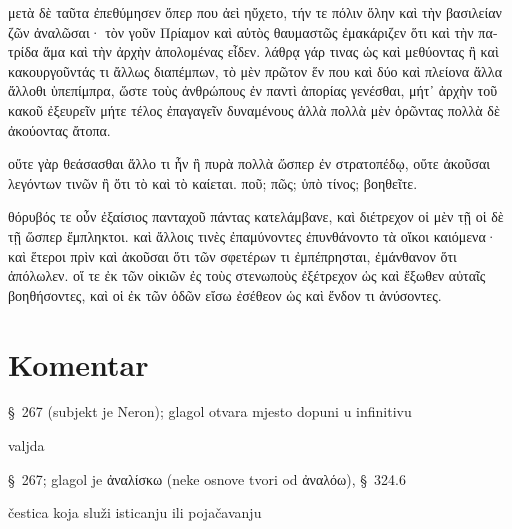 {\large

\begin{greek}

\noindent μετὰ δὲ ταῦτα ἐπεθύμησεν ὅπερ που ἀεὶ ηὔχετο, τήν τε πόλιν ὅλην καὶ τὴν βασιλείαν ζῶν ἀναλῶσαι· τὸν γοῦν Πρίαμον καὶ αὐτὸς θαυμαστῶς ἐμακάριζεν ὅτι καὶ τὴν πατρίδα ἅμα καὶ τὴν ἀρχὴν ἀπολομένας εἶδεν. λάθρᾳ γάρ τινας ὡς καὶ μεθύοντας ἢ καὶ κακουργοῦντάς τι ἄλλως διαπέμπων, τὸ μὲν πρῶτον ἕν που καὶ δύο καὶ πλείονα ἄλλα ἄλλοθι ὑπεπίμπρα, ὥστε τοὺς ἀνθρώπους ἐν παντὶ ἀπορίας γενέσθαι, μήτ᾽ ἀρχὴν τοῦ κακοῦ ἐξευρεῖν μήτε τέλος ἐπαγαγεῖν δυναμένους ἀλλὰ πολλὰ μὲν ὁρῶντας πολλὰ δὲ ἀκούοντας ἄτοπα. 

\noindent οὔτε γὰρ θεάσασθαι ἄλλο τι ἦν ἢ πυρὰ πολλὰ ὥσπερ ἐν στρατοπέδῳ, οὔτε ἀκοῦσαι λεγόντων τινῶν ἢ ὅτι τὸ καὶ τὸ καίεται. ποῦ; πῶς; ὑπὸ τίνος; βοηθεῖτε.

\noindent θόρυβός τε οὖν ἐξαίσιος πανταχοῦ πάντας κατελάμβανε, καὶ διέτρεχον οἱ μὲν τῇ οἱ δὲ τῇ ὥσπερ ἔμπληκτοι. καὶ ἄλλοις τινὲς ἐπαμύνοντες ἐπυνθάνοντο τὰ οἴκοι καιόμενα· καὶ ἕτεροι πρὶν καὶ ἀκοῦσαι ὅτι τῶν σφετέρων τι ἐμπέπρησται, ἐμάνθανον ὅτι ἀπόλωλεν. οἵ τε ἐκ τῶν οἰκιῶν ἐς τοὺς στενωποὺς ἐξέτρεχον ὡς καὶ ἔξωθεν αὐταῖς βοηθήσοντες, καὶ οἱ ἐκ τῶν ὁδῶν εἴσω ἐσέθεον ὡς καὶ ἔνδον τι ἀνύσοντες.

\end{greek}

}


\section*{Komentar}


\begin{description}[noitemsep]
\item[ἐπεθύμησεν] §~267 (subjekt je Neron); glagol otvara mjesto dopuni u infinitivu
\item[που] valjda 
\item[ἀναλῶσαι] §~267; glagol je ἀναλίσκω (neke osnove tvori od ἀναλόω), §~324.6
\item[γοῦν] čestica koja služi isticanju ili pojačavanju  
\end{description}

